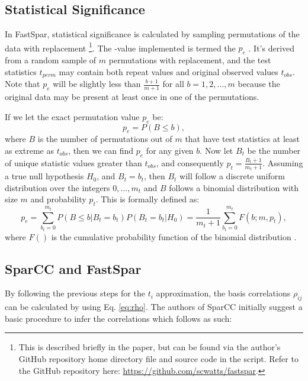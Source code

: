 \subsection{Statistical Significance}\label{theory-signif}
In FastSpar, statistical significance is calculated by sampling permutations of the data with replacement \citep{Watts2018}\footnote{This is described briefly in the paper, but can be found via the author's GitHub repository home directory  file and source code in the   script. Refer to the GitHub repository here: \url{https://github.com/scwatts/fastspar}.}. The -value implemented is termed the  $p_e$ \citep{Phipson2010}. It's derived from a random sample of $m$ permutations with replacement, and the test statistics $t_{perm}$ may contain both repeat values and original observed values $t_{obs}$. Note that $p_e$ will be slightly less than $\frac{b+1}{m+1}$ for all $b = 1,2,...,m$ because the original data may be present at least once in one of the permutations.

If we let the exact permutation value $p_e$ be:
\begin{equation}\label{eq:p_e1}
    p_e = P\left( B \leq b \right),
\end{equation}
where $B$ is the number of permutations out of $m$ that have test statistics at least as extreme as $t_{obs}$, then we can find $p_e$ for any given $b$. Now let $B_t$ be the number of unique statistic values greater than $t_{obs}$, and consequently $p_t = \frac{B_t+1}{m_t+1}$. Assuming a true null hypothesis $H_0$, and $B_t = b_t$, then $B_t$ will follow a discrete uniform distribution over the integers $0,...,m_t$ and $B$ follows a binomial distribution with size $m$ and probability $p_t$. This is formally defined as:
\begin{equation}\label{eq:pe_2}
    p_e = \sum_{b_t=0}^{m_t} P\left(B \leq b|B_t = b_t \right) P\left(B_t = b_t| H_0 \right) = \frac{1}{m_t +1}\sum_{b_t=0}^{m_t} F\left( b;m,p_t \right),
\end{equation}
where $F()$ is the cumulative probability function of the binomial distribution \citep{Phipson2010}.

\subsection{SparCC and FastSpar}\label{theory-sparcc-algo}
By following the previous steps for the $t_i$ approximation, the basis correlations $\rho_{ij}$ can be calculated by using Eq. \ref{eq:rho}. The authors of SparCC initially suggest a basic procedure to infer the correlations which follows as such:

